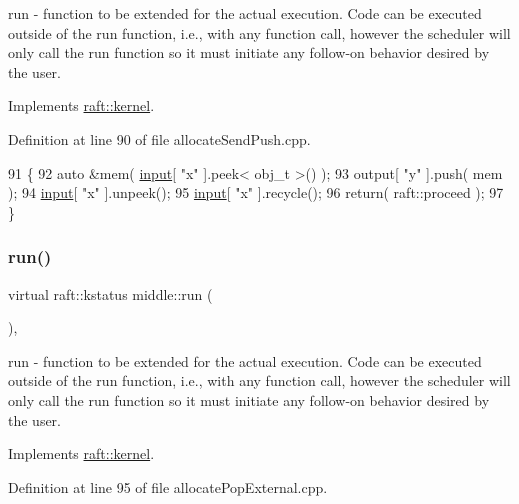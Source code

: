 run -\/ function to be extended for the actual execution. Code can be executed outside of the run function, i.\+e., with any function call, however the scheduler will only call the run function so it must initiate any follow-\/on behavior desired by the user. 

Implements \hyperlink{classraft_1_1kernel_a05094286d7577360fb1b91c91fc05901}{raft\+::kernel}.



Definition at line 90 of file allocate\+Send\+Push.\+cpp.


\begin{DoxyCode}
91     \{
92         \textcolor{keyword}{auto} &mem( \hyperlink{classraft_1_1kernel_a6edbe35a56409d402e719b3ac36d6554}{input}[ \textcolor{stringliteral}{"x"} ].peek< obj\_t >() );
93         output[ \textcolor{stringliteral}{"y"} ].push( mem );
94         \hyperlink{classraft_1_1kernel_a6edbe35a56409d402e719b3ac36d6554}{input}[ \textcolor{stringliteral}{"x"} ].unpeek();
95         \hyperlink{classraft_1_1kernel_a6edbe35a56409d402e719b3ac36d6554}{input}[ \textcolor{stringliteral}{"x"} ].recycle();
96         \textcolor{keywordflow}{return}( raft::proceed );
97     \}
\end{DoxyCode}
\hypertarget{classmiddle_a9aa7415c102af751be9c7af4771b6f16}{}\label{classmiddle_a9aa7415c102af751be9c7af4771b6f16} 
\subsubsection{\texorpdfstring{run()}{run()}\hspace{0.1cm}{\footnotesize\ttfamily [4/4]}}
{\footnotesize\ttfamily virtual raft\+::kstatus middle\+::run (\begin{DoxyParamCaption}{ }\end{DoxyParamCaption})\hspace{0.3cm}{\ttfamily [inline]}, {\ttfamily [virtual]}}

run -\/ function to be extended for the actual execution. Code can be executed outside of the run function, i.\+e., with any function call, however the scheduler will only call the run function so it must initiate any follow-\/on behavior desired by the user. 

Implements \hyperlink{classraft_1_1kernel_a05094286d7577360fb1b91c91fc05901}{raft\+::kernel}.



Definition at line 95 of file allocate\+Pop\+External.\+cpp.


